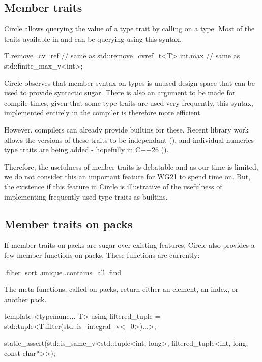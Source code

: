 \documentclass{wg21}
\begin{document}
\subsection{Member traits}
\label{sec:membertraits}

Circle allows querying the value of a type trait by calling \emph{} on a type.
Most of the traits available in  and  can be querying using this syntax.

\begin{colorblock}
T.remove_cv_ref  // same as std::remove_cvref_t<T>
int.max          // same as std::finite_max_v<int>;
\end{colorblock}

Circle observes that member syntax on types is unused design space that can be used to provide syntactic sugar.
There is also an argument to be made for compile times, given that some type traits are used very frequently,
this syntax, implemented entirely in the compiler is therefore more efficient.

However, compilers can already provide builtins for these.
Recent library work allows the  versions of these traits to be independant (),
and individual numerics type traits are being added - hopefully in C++26 ().

Therefore, the usefulness of menber traits is debatable and as our time is limited, we do not consider this an important feature
for WG21 to spend time on.
But, the existence if this feature in Circle is illustrative of the usefulness of implementing frequently used type traits as builtins.

\subsection{Member traits on packs}

If member traits on packs are sugar over existing features, Circle also provides a few member functions on packs.
These functions are currently:
\begin{codeblock}
.filter
.sort
.unique
.contains_all
.find
\end{codeblock}

The meta functions, called on packs, return either an element, an index, or another pack.

\begin{colorblock}
template <typename... T>
using filtered_tuple = std::tuple<T.filter(std::is_integral_v<_0>)...>;

static_assert(std::is_same_v<std::tuple<int, long>,
                             filtered_tuple<int, long, const char*>>);
\end{colorblock}
\end{document}
